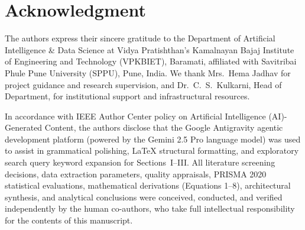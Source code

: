 \documentclass[conference,a4paper]{IEEEtran}
\begin{document}
\section*{Acknowledgment}
\begin{samepage}
The authors express their sincere gratitude to the Department of Artificial Intelligence \& Data Science at Vidya Pratishthan's Kamalnayan Bajaj Institute of Engineering and Technology (VPKBIET), Baramati, affiliated with Savitribai Phule Pune University (SPPU), Pune, India. We thank Mrs.~Hema Jadhav for project guidance and research supervision, and Dr.~C.~S.~Kulkarni, Head of Department, for institutional support and infrastructural resources.

\noindent In accordance with IEEE Author Center policy on Artificial Intelligence (AI)-Generated Content, the authors disclose that the Google Antigravity agentic development platform (powered by the Gemini 2.5 Pro language model) was used to assist in grammatical polishing, LaTeX structural formatting, and exploratory search query keyword expansion for Sections~I--III. All literature screening decisions, data extraction parameters, quality appraisals, PRISMA 2020 statistical evaluations, mathematical derivations (Equations 1--8), architectural synthesis, and analytical conclusions were conceived, conducted, and verified independently by the human co-authors, who take full intellectual responsibility for the contents of this manuscript.
\end{samepage}
\end{document}

